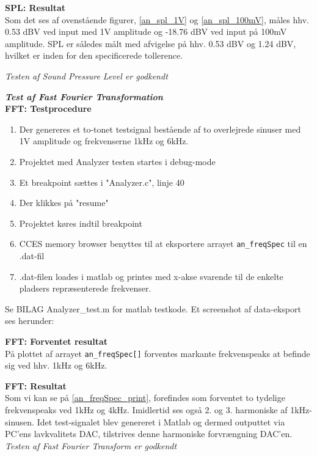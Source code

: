 \textbf{SPL: Resultat} \\
Som det ses af ovenstående figurer, \ref{an_spl_1V} og \ref{an_spl_100mV}, måles hhv. 0.53 dBV ved input med 1V amplitude og -18.76 dBV ved input på 100mV amplitude. SPL er således målt med afvigelse på hhv. 0.53 dBV og 1.24 dBV, hvilket er inden for den specificerede tollerence.
 
\textit{Testen af Sound Pressure Level er godkendt}

\textbf{\textit{Test af Fast Fourier Transformation}}\\
\textbf{FFT: Testprocedure}
\begin{enumerate}
	\item Der genereres et to-tonet testsignal bestående af to overlejrede sinuser med 1V amplitude og frekvenserne 1kHz og 6kHz.	
	\item Projektet med Analyzer testen startes i debug-mode
	\item Et breakpoint sættes i "Analyzer.c", linje 40 
	\item Der klikkes på "resume"
	\item Projektet køres indtil breakpoint
	\item CCES memory browser benyttes til at eksportere arrayet \verb+an_freqSpec+ til en .dat-fil 
	\item .dat-filen loades i matlab og printes med x-akse svarende til de enkelte pladsers repræsenterede frekvenser.
\end{enumerate}
Se BILAG Analyzer\_test.m for matlab testkode. Et screenshot af data-eksport ses herunder:

\textbf{FFT: Forventet resultat} \\
På plottet af arrayet \verb+an_freqSpec[]+ forventes markante frekvenspeaks at befinde sig ved hhv. 1kHz og 6kHz. 

\textbf{FFT: Resultat} \\
Som vi kan se på \ref{an_freqSpec_print}, forefindes som forventet to tydelige frekvenspeaks ved 1kHz og 4kHz. Imidlertid ses også 2. og 3. harmoniske af 1kHz-sinusen. Idet test-signalet blev genereret i Matlab og dermed outputtet via PC'ens lavkvalitets DAC, tilstrives denne harmoniske forvrængning DAC'en.
\textit{Testen af Fast Fourier Transform er godkendt}

